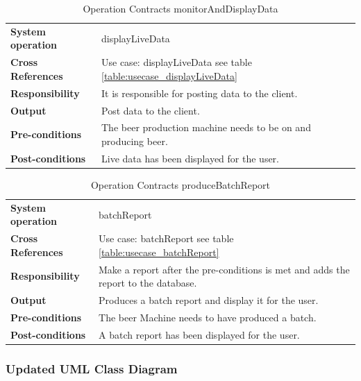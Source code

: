 \begin{table}[H]
    \begin{tabularx}{\textwidth}{|>{\RaggedRight}p{3.7cm}|>{\RaggedRight}X|}
        \hline
        \multicolumn{2}{|c|}{\textbf{display live data}}\\
        \hline
        \textbf{System operation} & displayLiveData\\
        \hline
        \textbf{Cross References} & Use case: displayLiveData see table \ref{table:usecase_displayLiveData} \\
        \hline
        \textbf{Responsibility} & It is responsible for posting data to the client. \\ 
        \hline
        \textbf{Output} & Post data to the client.  \\
        \hline
        \textbf{Pre-conditions} & The beer production machine needs to be on and
                producing beer. \\
        \hline
        \textbf{Post-conditions} & Live data has been displayed for the user. \\
        \hline
    \end{tabularx}
    \caption{Operation Contracts monitorAndDisplayData} 
    \label{table:Operation_Contracts_monitorAndDisplayData}
\end{table}

\begin{table}[H]
    \begin{tabularx}{\textwidth}{|>{\RaggedRight}p{3.7cm}|>{\RaggedRight}X|}
        \hline
        \multicolumn{2}{|c|}{\textbf{batchReport}}\\
        \hline
        \textbf{System operation} & batchReport\\
        \hline
        \textbf{Cross References} & Use case: batchReport see table \ref{table:usecase_batchReport} \\
        \hline
        \textbf{Responsibility} &  Make a report after the pre-conditions is met
                and adds the report to the database.\\
        \hline
        \textbf{Output} & Produces a batch report and display it for the user.\\
        \hline
        \textbf{Pre-conditions} & The beer Machine needs to have produced a batch.\\
        \hline
        \textbf{Post-conditions} & A batch report has been displayed for the
                user. \\
        \hline
    \end{tabularx}
    \caption{Operation Contracts produceBatchReport} 
    \label{table:Operation_Contracts_produceBatchReport}
\end{table}

\subsubsection{Updated UML Class Diagram}
